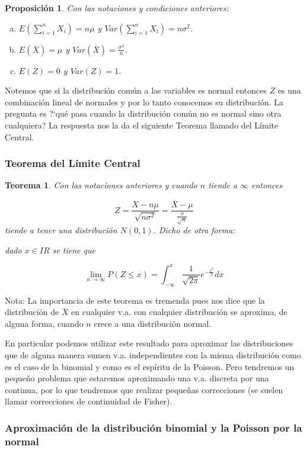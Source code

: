 \documentclass[12pt]{report}
\newtheorem{theorem}[definition]{Teorema}
\newtheorem{proposition}[definition]{Proposici\'on}
\def\R{I\!\!R}
\begin{document}
    \begin{proposition} Con las notaciones y condiciones anteriores:
\begin{enumerate}[a)]
\item $E(\sum_{i=1}^n X_i)=n \mu$ y $Var(\sum_{i=1}^n X_i)=n \sigma^2$.
\item $E(\overline{X})=\mu$ y $Var(\overline{X})=\frac{\sigma^2}{n}$.
\item $E(Z)=0$ y $Var(Z)=1$.
\end{enumerate}
\end{proposition}

 Notemos que si la distribución común a las variables es normal entonces
$Z$ es una combinación lineal de normales y por lo tanto conocemos su distribución. La
pregunta es ?`qué pasa cuando la distribución común no es normal sino otra cualquiera? La
respuesta nos la da el siguiente Teorema llamado del Límite Central.

    \subsubsection{Teorema del Límite Central }
    \begin{theorem}
Con las notaciones anteriores y cuando $n$ tiende a $\infty$ entonces

$$Z=\frac{X-n\mu}{\sqrt{n\sigma^2}}=\frac{\overline{X}-\mu}{\frac{\sigma}{\sqrt{n}}}$$
tiende a tener una distribución $N(0,1)$. Dicho de otra forma:


dado $x\in \R$ se tiene que

 $$\lim_{n\to\infty}P(Z\leq x)=\int_{-\infty}^x \frac{1}{\sqrt{2
\pi}} e^{-\frac{x^2}{2}}dx$$

\end{theorem}

Nota: La importancia de este teorema es tremenda pues nos dice que la distribución de
$\overline{X}$ en cualquier v.a. con cualquier distribución se aproxima, de alguna forma,
cuando $n$ crece a una distribución normal.

En particular podemos utilizar este resultado para aproximar las distribuciones que de
alguna manera sumen v.a. independientes con la misma distribución como es el caso de la
binomial y como es el espíritu de la Poisson. Pero tendremos un pequeño  problema que
estaremos aproximando una v.a. discreta por una continua, por lo que tendremos que realizar
pequeñas correcciones (se suelen llamar correcciones de continuidad de Fisher).

 \subsubsection{Aproximación de la distribución binomial y la Poisson
    por la normal}
\end{document}
